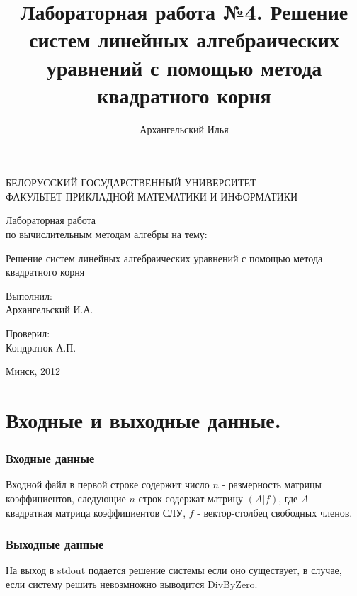 \documentclass[a4paper,11pt]{article}
\title{Лабораторная работа №4. Решение систем линейных алгебраических уравнений с помощью метода квадратного корня}
\author{Архангельский Илья}
\begin{document}
\begin{titlepage}
	\begin{center}
		БЕЛОРУССКИЙ ГОСУДАРСТВЕННЫЙ УНИВЕРСИТЕТ \\
		ФАКУЛЬТЕТ ПРИКЛАДНОЙ МАТЕМАТИКИ И ИНФОРМАТИКИ
	\end{center}
	\vspace{10em}
	\begin{center}
		\LARGE {Лабораторная работа \\
		по вычислительным методам алгебры на тему:}
		\linebreak	 
		
    Решение систем линейных алгебраических уравнений с помощью метода квадратного корня
	\end{center}
	\vspace{3em}
	\begin{flushright}
	  
	
 	Выполнил: \\	Архангельский И.А. \\ 
 	
 	  \vspace{1em}
 	
 	  Проверил: \\ Кондратюк А.П. \\
 	
	\end{flushright}
	
	\vfill
	\begin{center}
		Минск, 2012
	\end{center}
\end{titlepage} 

\newpage
\part*{Входные и выходные данные.} 
\section*{Входные данные}
Входной файл в первой строке содержит число $n$ - размерность матрицы коэффициентов, следующие $n$ строк содержат матрицу $(A|f)$, где  
  $A$ - квадратная матрица коэффициентов СЛУ, 
  $f$ - вектор-столбец свободных членов.
\section*{Выходные данные}
На выход в stdout подается решение системы если оно существует, в случае, если систему решить невозмножно выводится DivByZero. 
\newpage
\end{document}
